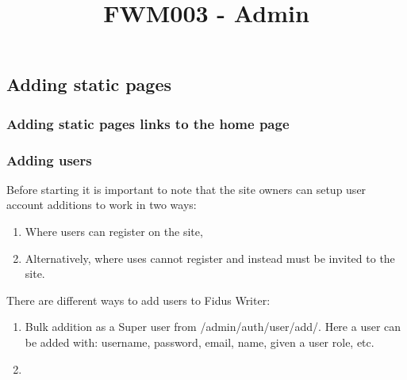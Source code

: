 \documentclass{article}
\begin{document}
\title{FWM003 - Admin}

\maketitle





\subsection{Adding static pages}\label{H8791447}






\subsubsection{Adding static pages links to the home page}\label{H2279564}



\subsubsection{Adding users}\label{H9537775}



Before starting it is important to note that the site owners can setup user account additions to work in two ways:

\begin{enumerate}
\item Where users can register on the site,


\item Alternatively, where uses cannot register and instead must be invited to the site.


\end{enumerate}

There are different ways to add users to Fidus Writer:

\begin{enumerate}
\item Bulk addition as a Super user from /admin/auth/user/add/. Here a user can be added with: username, password, email, name, given a user role, etc.


\item 


\end{enumerate}

\subsection{}\label{H5769420}
\end{document}
